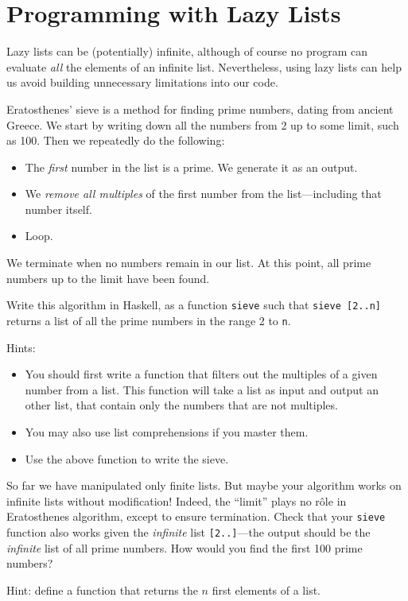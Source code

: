\documentclass{article}
\begin{document}
\section{Programming with Lazy Lists}
Lazy lists can be (potentially) infinite, although of course no
program can evaluate {\em all} the elements of an infinite
list. Nevertheless, using lazy lists can help us avoid building
unnecessary limitations into our code.

Eratosthenes' sieve is a method for finding prime numbers, dating from
ancient Greece. We start by writing down all the numbers from 2 up to
some limit, such as 100. Then we repeatedly do the following:
\begin{itemize}
\item
The {\em first} number in the list is a prime. We generate it as an
output.
\item
We {\em remove all multiples} of the first number from the
list---including that number itself.
\item
Loop.
\end{itemize}
We terminate when no numbers remain in our list. At this point, all
prime numbers up to the limit have been found.

Write this algorithm in Haskell, as a function \verb!sieve! such that
\verb!sieve [2..n]! returns a list of all the prime numbers in the
range 2 to \verb!n!. 

Hints:
\begin{itemize}
\item You should first write a function that filters out the multiples
  of a given number from a list. This function will take a list as input
  and output an other list, that contain only the numbers that are not multiples.

\item
  You may also use list comprehensions if you master them.

\item
  Use the above function to write the sieve.
\end{itemize}




So far we have manipulated only finite lists. But maybe your algorithm works on
infinite lists without modification!
Indeed, the ``limit'' plays no r\^ole in Eratosthenes algorithm,
except to ensure termination. Check that your \verb!sieve! function
also works given the {\em infinite} list \verb![2..]!---the output
should be the {\em infinite} list of all prime numbers. How would you
find the first 100 prime numbers? 

Hint: define a function that returns the $n$ first elements of a list.
\end{document}
